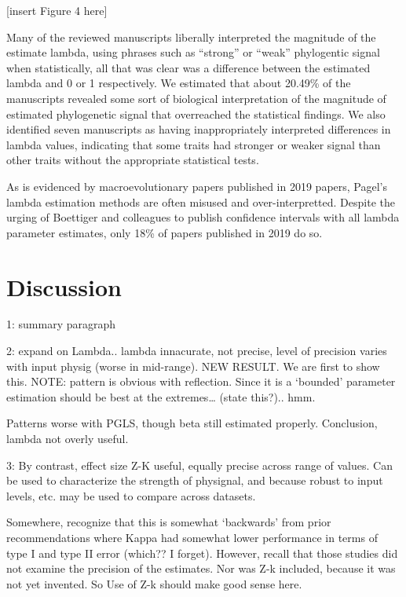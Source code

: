 \documentclass[
]{article}
\begin{document}
{[}insert Figure 4 here{]} \hfill\break

Many of the reviewed manuscripts liberally interpreted the magnitude of
the estimate lambda, using phrases such as ``strong'' or ``weak''
phylogentic signal when statistically, all that was clear was a
difference between the estimated lambda and 0 or 1 respectively. We
estimated that about 20.49\% of the manuscripts revealed some sort of
biological interpretation of the magnitude of estimated phylogenetic
signal that overreached the statistical findings. We also identified
seven manuscripts as having inappropriately interpreted differences in
lambda values, indicating that some traits had stronger or weaker signal
than other traits without the appropriate statistical tests.
\hfill\break

As is evidenced by macroevolutionary papers published in 2019 papers,
Pagel's lambda estimation methods are often misused and
over-interpretted. Despite the urging of Boettiger and colleagues to
publish confidence intervals with all lambda parameter estimates, only
18\% of papers published in 2019 do so.

\hypertarget{discussion}{%
\section{Discussion}\label{discussion}}

1: summary paragraph

2: expand on Lambda.. lambda innacurate, not precise, level of precision
varies with input physig (worse in mid-range). NEW RESULT. We are first
to show this. NOTE: pattern is obvious with reflection. Since it is a
`bounded' parameter estimation should be best at the extremes\ldots{}
(state this?).. hmm.

Patterns worse with PGLS, though beta still estimated properly.
Conclusion, lambda not overly useful.

3: By contrast, effect size Z-K useful, equally precise across range of
values. Can be used to characterize the strength of physignal, and
because robust to input levels, etc. may be used to compare across
datasets.

Somewhere, recognize that this is somewhat `backwards' from prior
recommendations where Kappa had somewhat lower performance in terms of
type I and type II error (which?? I forget). However, recall that those
studies did not examine the precision of the estimates. Nor was Z-k
included, because it was not yet invented. So Use of Z-k should make
good sense here.
\end{document}
